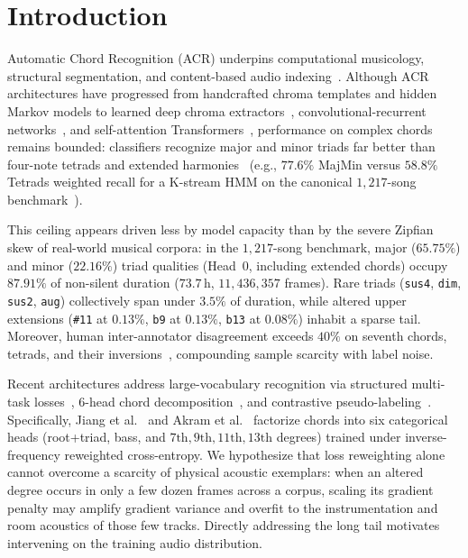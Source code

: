 \section{Introduction}\label{sec:intro}

Automatic Chord Recognition (ACR) underpins computational musicology, structural segmentation, and content-based audio indexing~\cite{pauwels2019twenty}. Although ACR architectures have progressed from handcrafted chroma templates and hidden Markov models to learned deep chroma extractors~\cite{korzeniowski2016feature}, convolutional-recurrent networks~\cite{jiang2019large}, and self-attention Transformers~\cite{park2019btc,gulati2020conformer}, performance on complex chords remains bounded: classifiers recognize major and minor triads far better than four-note tetrads and extended harmonies~\cite{pauwels2019twenty} (e.g., $77.6\%$ MajMin versus $58.8\%$ Tetrads weighted recall for a K-stream HMM on the canonical $1{,}217$-song benchmark~\cite{humphrey2015four}).

This ceiling appears driven less by model capacity than by the severe Zipfian skew of real-world musical corpora: in the $1{,}217$-song benchmark, major ($65.75\%$) and minor ($22.16\%$) triad qualities (Head~0, including extended chords) occupy $87.91\%$ of non-silent duration ($73.7\,\text{h}$, $11{,}436{,}357$ frames). Rare triads ({\small\texttt{sus4}}, {\small\texttt{dim}}, {\small\texttt{sus2}}, {\small\texttt{aug}}) collectively span under $3.5\%$ of duration, while altered upper extensions ({\small\texttt{\#11}} at $0.13\%$, {\small\texttt{b9}} at $0.13\%$, {\small\texttt{b13}} at $0.08\%$) inhabit a sparse tail. Moreover, human inter-annotator disagreement exceeds $40\%$ on seventh chords, tetrads, and their inversions~\cite{koops2019annotator}, compounding sample scarcity with label noise.

Recent architectures address large-vocabulary recognition via structured multi-task losses~\cite{mcfee2017structured}, 6-head chord decomposition~\cite{jiang2019large,akram2026chordformer}, and contrastive pseudo-labeling~\cite{li2025large}. Specifically, Jiang et al.~\cite{jiang2019large} and Akram et al.~\cite{akram2026chordformer} factorize chords into six categorical heads (root+triad, bass, and $7\text{th}, 9\text{th}, 11\text{th}, 13\text{th}$ degrees) trained under inverse-frequency reweighted cross-entropy. We hypothesize that loss reweighting alone cannot overcome a scarcity of physical acoustic exemplars: when an altered degree occurs in only a few dozen frames across a corpus, scaling its gradient penalty may amplify gradient variance and overfit to the instrumentation and room acoustics of those few tracks. Directly addressing the long tail motivates intervening on the training audio distribution.

